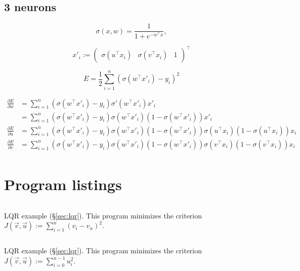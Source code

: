 \documentclass[notitlepage,oneside]{book}
\makeatletter
\newcommand{\authoredby}[1]{\addtocontents{toc}{\protect\@nameuse{authoredby#1}}}%
\makeatother
\begin{document}
\section{3 neurons}
$$
\sigma(x,w) = \frac{1}{1+e^{-w^\top x}},
$$

$$
x'_i :=  \begin{pmatrix} \sigma(u^\top x_i) &  \sigma(v^\top x_i) & 1\end{pmatrix}^\top
$$

$$
E = \frac{1}{2}\sum_{i=1}^{n} \left(\sigma\left(w^\top x'_i\right) - y_i\right)^2
$$

\begin{align*}
\frac{\partial E}{\partial w} & =  \sum_{i=1}^{n} \left(\sigma\left(w^\top x'_i\right)  - y_i\right) \sigma'\left(w^\top x'_i\right)  x'_i \\
                              & =  \sum_{i=1}^{n} \left(\sigma\left(w^\top x'_i\right)  - y_i\right) \sigma\left(w^\top x'_i\right) (1-\sigma\left(w^\top x'_i\right) ) x'_i \\
\frac{\partial E}{\partial u} & =  \sum_{i=1}^{n} \left(\sigma\left(w^\top x'_i\right)  - y_i\right) \sigma\left(w^\top x'_i\right) (1-\sigma\left(w^\top x'_i\right) ) \sigma\left(u^\top x_i\right) (1-\sigma\left(u^\top x_i\right) ) x_i \\
\frac{\partial E}{\partial v} & =  \sum_{i=1}^{n} \left(\sigma\left(w^\top x'_i\right)  - y_i\right) \sigma\left(w^\top x'_i\right) (1-\sigma\left(w^\top x'_i\right) ) \sigma\left(v^\top x_i\right) (1-\sigma\left(v^\top x_i\right) ) x_i \\
\end{align*}


\appendix
\authoredby{B}
\chapter{Program listings}
\fancyhead[R]{\textcolor{green}{core text}}

\begin{listing}[p]
\inputminted[frame=single,linenos=true]{python}{listings/example_6.1_a.py}
\caption{LQR example (\S\ref{sec:lqr}). This program minimizes the criterion $J(\vec{v}, \vec{u}) := \sum\limits_{i=1}^n (v_i-v_n)^2$.}
\label{listing:lqr1}
\end{listing}

\begin{listing}[p]
\inputminted[frame=single,linenos=true]{python}{listings/example_6.1_b.py}
\caption{LQR example (\S\ref{sec:lqr}). This program minimizes the criterion $J(\vec{v}, \vec{u}) := \sum\limits_{i=0}^{n-1} u_i^2$.}
\label{listing:lqr2}
\end{listing}
\end{document}
